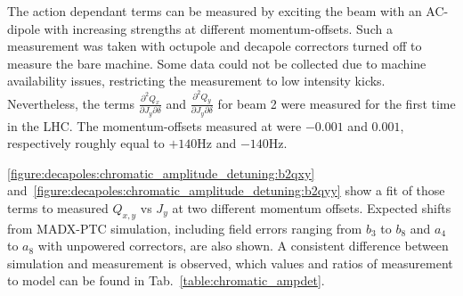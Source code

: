 The action dependant terms can be measured by exciting the beam with an
AC-dipole with increasing strengths at different momentum-offsets.
Such a measurement was taken with octupole and decapole correctors turned off to measure the bare
machine. Some data could not be collected due to machine availability issues, restricting the
measurement to low intensity kicks. Nevertheless, the terms $\frac{\partial^2 Q_x}{\partial J_y
\partial \delta}$ and $\frac{\partial^2 Q_y}{\partial J_y \partial \delta}$ for beam 2 were measured
for the first time in the LHC.
The momentum-offsets measured at were $-0.001$ and $0.001$, respectively roughly equal to $+140$Hz
and $-140$Hz.

\cref{figure:decapoles:chromatic_amplitude_detuning:b2qxy}
and~\cref{figure:decapoles:chromatic_amplitude_detuning:b2qyy} show a fit of those terms to measured
$Q_{x,y}$ vs $J_{y}$ at two different momentum offsets.  Expected shifts from MADX-PTC simulation,
including field errors ranging from $b_3$ to $b_8$ and $a_4$ to $a_8$ with unpowered correctors, are
also shown. A consistent difference between simulation and measurement is observed, which values and
ratios of measurement to model can be found in Tab.~\ref{table:chromatic_ampdet}.

